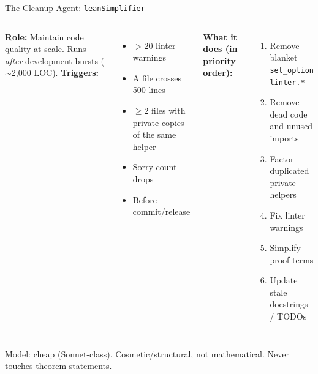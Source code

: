 \documentclass[aspectratio=169,10pt]{beamer}
\begin{document}
\begin{frame}{The Cleanup Agent: \texttt{leanSimplifier}}
    \begin{columns}[T]
        \textcolor{amber}{\textbf{Role:}} Maintain code quality at scale. Runs \emph{after} development bursts (${\sim}$2{,}000 LOC).
        \vspace{0.3em}
        \textbf{Triggers:}
        \begin{itemize}
            \item $>$20 linter warnings
            \item A file crosses 500 lines
            \item $\ge 2$ files with private copies of the same helper
            \item Sorry count drops
            \item Before commit/release
        \end{itemize}
        \textbf{What it does (in priority order):}
        \begin{enumerate}
            \item Remove blanket \texttt{set\_option linter.*}
            \item Remove dead code and unused imports
            \item Factor duplicated private helpers
            \item Fix linter warnings
            \item Simplify proof terms
            \item Update stale docstrings / TODOs
        \end{enumerate}
    \end{columns}
    \vspace{0.3em}
    \textcolor{dimwhite}{\footnotesize Model: cheap (Sonnet-class). Cosmetic/structural, not mathematical. Never touches theorem statements.}
\end{frame}
\end{document}
